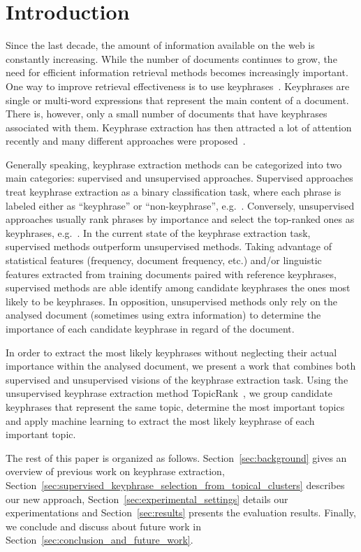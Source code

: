 \section{Introduction}
\label{sec:introduction}
  Since the last decade, the amount of information available on the web is
  constantly increasing. While the number of documents continues to grow, the
  need for efficient information retrieval methods becomes increasingly
  important. One way to improve retrieval effectiveness is to use
  keyphrases~\cite{jones1999phrasier}. Keyphrases are single or multi-word
  expressions that represent the main content of a document. There is, however,
  only a small number of documents that have keyphrases associated with them.
  Keyphrase extraction has then attracted a lot of attention recently and many
  different approaches were proposed~\cite{hasan2014state_of_the_art}.

  Generally speaking, keyphrase extraction methods can be categorized into two
  main categories: supervised and unsupervised approaches. Supervised approaches
  treat keyphrase extraction as a binary classification task, where each phrase
  is labeled either as ``keyphrase'' or ``non-keyphrase'',
  e.g.~\cite{witten1999kea}. Conversely, unsupervised approaches usually rank
  phrases by importance and select the top-ranked ones as keyphrases,
  e.g.~\cite{mihalcea2004textrank}.
  In the current state of the keyphrase extraction task, supervised methods
  outperform unsupervised methods. Taking advantage of statistical features
  (frequency, document frequency, etc.) and/or linguistic features extracted
  from training documents paired with reference keyphrases, supervised methods
  are able identify among candidate keyphrases the ones most likely to be
  keyphrases. In opposition, unsupervised methods only rely on the analysed
  document (sometimes using extra information) to determine the importance of
  each candidate keyphrase in regard of the document.

  In order to extract the most likely keyphrases without neglecting their actual
  importance within the analysed document, we present a work that combines both
  supervised and unsupervised visions of the keyphrase extraction task. Using
  the unsupervised keyphrase extraction method
  Topic\-Rank~\cite{bougouin2013topicrank}, we group candidate keyphrases that
  represent the same topic, determine the most important topics and apply
  machine learning to extract the most likely keyphrase of each important topic.

  The rest of this paper is organized as follows. Section~\ref{sec:background}
  gives an overview of previous work on keyphrase extraction,
  Section~\ref{sec:supervised_keyphrase_selection_from_topical_clusters}
  describes our new approach, Section~\ref{sec:experimental_settings} details
  our experimentations and Section~\ref{sec:results} presents the evaluation
  results. Finally, we conclude and discuss about future work in
  Section~\ref{sec:conclusion_and_future_work}.

